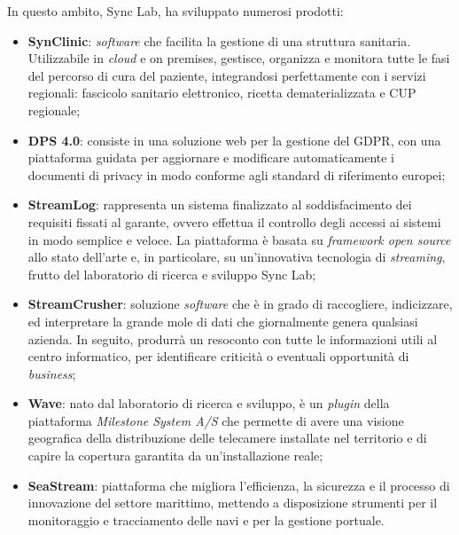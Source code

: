\noindent In questo ambito, Sync Lab, ha sviluppato numerosi prodotti:
\begin{itemize}
  \item \textbf{SynClinic}: \textit{software} che facilita la gestione di una struttura sanitaria. Utilizzabile in \textit{cloud} e \gls{on premises}, gestisce, organizza e monitora tutte le fasi del percorso di cura del paziente, integrandosi perfettamente con i servizi regionali: fascicolo sanitario elettronico, ricetta dematerializzata e CUP regionale;
  
  \item \textbf{DPS 4.0}: consiste in una soluzione web per la gestione del GDPR, con una piattaforma guidata per aggiornare e modificare automaticamente i documenti di privacy in modo conforme agli standard di riferimento europei;
  
  \item \textbf{StreamLog}: rappresenta un sistema finalizzato al soddisfacimento dei requisiti fissati al garante, ovvero effettua il controllo degli accessi ai sistemi in modo semplice e veloce. La piattaforma è basata su \textit{framework open source} allo stato dell'arte e, in particolare, su un'innovativa tecnologia di \textit{streaming}, frutto del laboratorio di ricerca e sviluppo Sync Lab;
  
  \item \textbf{StreamCrusher}: soluzione \textit{software} che è in grado di raccogliere, indicizzare, ed interpretare la grande mole di dati che giornalmente genera qualsiasi azienda. In seguito, produrrà un resoconto con tutte le informazioni utili al centro informatico, per identificare criticità o eventuali opportunità di \textit{business};
  
  \item \textbf{Wave}: nato dal laboratorio di ricerca e sviluppo, è un \textit{plugin} della piattaforma \textit{Milestone System A/S} che permette di avere una visione geografica della distribuzione delle telecamere installate nel territorio e di capire la copertura garantita da un'installazione reale;
  
  \item \textbf{SeaStream}: piattaforma che migliora l'efficienza, la sicurezza e il processo di innovazione del settore marittimo, mettendo a disposizione strumenti per il monitoraggio e tracciamento delle navi e per la gestione portuale.  
\end{itemize}